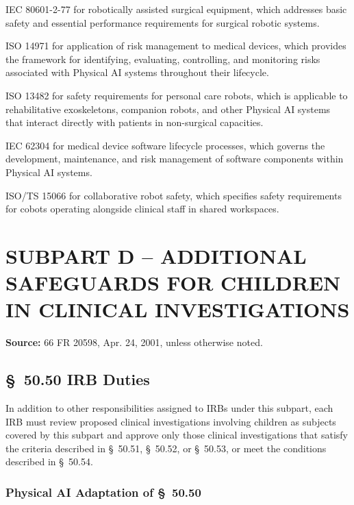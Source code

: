 \documentclass[11pt]{article}
\begin{document}
\begin{description}[leftmargin=1.0cm,style=sameline]
\item[(1)] IEC 80601-2-77 for robotically assisted surgical equipment, which addresses basic safety and essential performance requirements for surgical robotic systems.
\item[(2)] ISO 14971 for application of risk management to medical devices, which provides the framework for identifying, evaluating, controlling, and monitoring risks associated with Physical AI systems throughout their lifecycle.
\item[(3)] ISO 13482 for safety requirements for personal care robots, which is applicable to rehabilitative exoskeletons, companion robots, and other Physical AI systems that interact directly with patients in non-surgical capacities.
\item[(4)] IEC 62304 for medical device software lifecycle processes, which governs the development, maintenance, and risk management of software components within Physical AI systems.
\item[(5)] ISO/TS 15066 for collaborative robot safety, which specifies safety requirements for cobots operating alongside clinical staff in shared workspaces.
\end{description}

\section{SUBPART D -- ADDITIONAL SAFEGUARDS FOR CHILDREN IN CLINICAL INVESTIGATIONS}

\textbf{Source:} 66 FR 20598, Apr. 24, 2001, unless otherwise noted.

\subsection{\S~50.50 IRB Duties}

In addition to other responsibilities assigned to IRBs under this subpart, each IRB must review proposed clinical investigations involving children as subjects covered by this subpart and approve only those clinical investigations that satisfy the criteria described in \S~50.51, \S~50.52, or \S~50.53, or meet the conditions described in \S~50.54.

\subsubsection{Physical AI Adaptation of \S~50.50}
\end{document}
